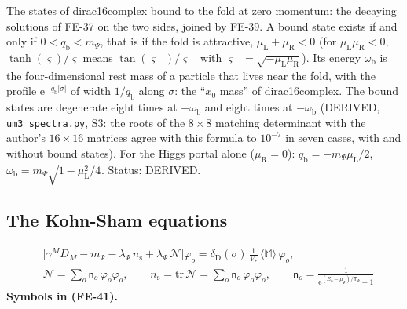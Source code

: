 \documentclass[
  10pt,
]{article}
\begin{document}
The states of dirac16complex bound to the fold at zero momentum: the
decaying solutions of FE-37 on the two sides, joined by FE-39. A bound
state exists if and only if \(0 < q_{\mathrm{b}} < m_\Psi\), that is if
the fold is attractive, \(\mu_{\mathrm{L}} + \mu_{\mathrm{R}} < 0\) (for
\(\mu_{\mathrm{L}}\mu_{\mathrm{R}} < 0\), \(\tanh(\varsigma)/\varsigma\)
means \(\tan(\varsigma_-)/\varsigma_-\) with
\(\varsigma_- = \sqrt{-\mu_{\mathrm{L}}\mu_{\mathrm{R}}}\)). Its energy
\(\omega_{\mathrm{b}}\) is the four-dimensional rest mass of a particle
that lives near the fold, with the profile
\(\mathrm{e}^{-q_{\mathrm{b}}\lvert\sigma\rvert}\) of width
\(1/q_{\mathrm{b}}\) along \(\sigma\): the ``\(x_0\) mass'' of
dirac16complex. The bound states are degenerate eight times at
\(+\omega_{\mathrm{b}}\) and eight times at \(-\omega_{\mathrm{b}}\)
(DERIVED, \texttt{um3\_spectra.py}, S3: the roots of the \(8 \times 8\)
matching determinant with the author's \(16 \times 16\) matrices agree
with this formula to \(10^{-7}\) in seven cases, with and without bound
states). For the Higgs portal alone (\(\mu_{\mathrm{R}} = 0\)):
\(q_{\mathrm{b}} = -m_\Psi\mu_{\mathrm{L}}/2\),
\(\omega_{\mathrm{b}} = m_\Psi\sqrt{1 - \mu_{\mathrm{L}}^2/4}\). Status:
DERIVED.

\hypertarget{the-kohn-sham-equations}{%
\subsection{The Kohn-Sham equations}\label{the-kohn-sham-equations}}

\[
\begin{aligned}
&\big[\gamma^MD_M - m_\Psi - \lambda_\Psi\,n_{\mathrm{s}} + \lambda_\Psi\,\mathcal{N}\big]\varphi_o
 = \delta_{\mathrm{D}}(\sigma)\,\frac{1}{V_*}\,\langle\mathbb{M}\rangle\,\varphi_o,\\
&\mathcal{N} = \sum_o\mathsf{n}_o\,\varphi_o\bar\varphi_o,\qquad n_{\mathrm{s}} = \mathrm{tr}\,\mathcal{N} = \sum_o\mathsf{n}_o\,\bar\varphi_o\varphi_o,\qquad
 \mathsf{n}_o = \frac{1}{\mathrm{e}^{(E_o - \mu_\Psi)/\mathsf{T}_\Psi} + 1}
\end{aligned} \tag{FE-41}
\] \textbf{Symbols in (FE-41).}
\end{document}
